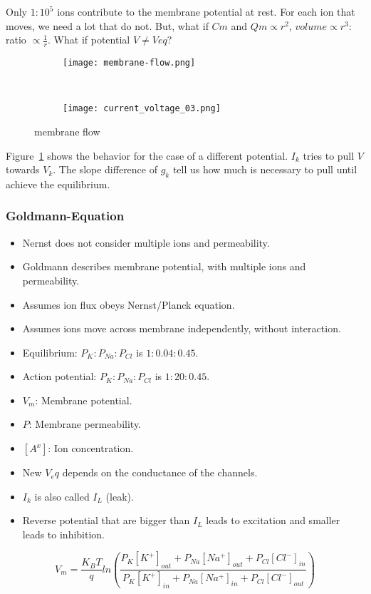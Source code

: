 \documentclass[main]{subfiles}
\begin{document}
Only $1:10^5$ ions contribute to the membrane potential at rest. For each ion that moves, we need a lot that do not.
But, what if $Cm$ and $Qm \propto r^2$, $volume \propto r^3$: ratio $\propto \frac{1}{r}$.
What if potential $V \neq Veq$?

\begin{figure}[H]
	\centering
	\begin{subfigure}[b]{0.5\textwidth}
		\centering
		\texttt{[image: membrane-flow.png]}
	\end{subfigure}%
	~
	\begin{subfigure}[b]{0.3\textwidth}
		\centering
		\texttt{[image: current\_voltage\_03.png]}
	\end{subfigure}
	\caption{membrane flow}
	\label{fig:membrane-flow}
\end{figure}

Figure~\ref{fig:membrane-flow} shows the behavior for the case of a different potential. $I_k$ tries to pull $V$ towards $V_k$. The slope difference of $g_k$ tell us how much is necessary to pull until achieve the equilibrium.

\subsubsection{Goldmann-Equation}
\begin{itemize}[noitemsep,nolistsep]
	\item Nernst does not consider multiple ions and permeability.
	\item Goldmann describes membrane potential, with multiple ions and permeability.
	\item Assumes ion flux obeys Nernst/Planck equation.
	\item Assumes ions move across membrane independently, without interaction.
	\item Equilibrium: $P_K:P_{Na}:P_{Cl}$ is $1:0.04:0.45$.
	\item Action potential: $P_K:P_{Na}:P_{Cl}$ is $1:20:0.45$.
	\item $V_m$: Membrane potential.
	\item $P$: Membrane permeability.
	\item $[A^x]$: Ion concentration.
	\item New $V_eq$ depends on the conductance of the channels.
	\item $I_k$ is also called $I_L$ (leak). 
	\item Reverse potential that are bigger than $I_L$ leads to excitation and smaller leads to inhibition.
\end{itemize}

\[V_m = \frac{K_BT}{q} ln(\frac{P_K[K^+]_{out} + P_{Na}[Na^+]_{out} + P_{Cl}[Cl^{-}]_{in}}{P_K[K^+]_{in} + P_{Na}[Na^+]_{in} + P_{Cl}[Cl^{-}]_{out}})\]
\end{document}
